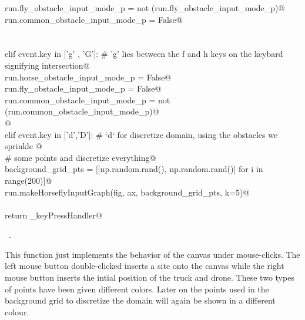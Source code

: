 \documentclass[11.5pt]{report}
\begin{document}
\begin{flushleft}
\begin{list}{}{}
\mbox{}\verb@                  run.fly_obstacle_input_mode_p     = not (run.fly_obstacle_input_mode_p)@\\
\mbox{}\verb@                  run.common_obstacle_input_mode_p  = False@\\
\mbox{}\verb@@\\
\mbox{}\verb@@\\
\mbox{}\verb@             elif event.key in ['g' , 'G']: # 'g' lies between the f and h keys on the keybard signifying intersection@\\
\mbox{}\verb@                  run.horse_obstacle_input_mode_p   = False@\\
\mbox{}\verb@                  run.fly_obstacle_input_mode_p     = False@\\
\mbox{}\verb@                  run.common_obstacle_input_mode_p  = not (run.common_obstacle_input_mode_p)@\\
\mbox{}\verb@    @\\
\mbox{}\verb@             elif event.key in ['d','D']: # `d` for discretize domain, using the obstacles we sprinkle @\\
\mbox{}\verb@                                          # some points and discretize everything@\\
\mbox{}\verb@                  background_grid_pts = [[np.random.rand(), np.random.rand()] for i in range(200)]@\\
\mbox{}\verb@                  run.makeHorseflyInputGraph(fig, ax, background_grid_pts, k=5)@\\
\mbox{}\verb@@\\
\mbox{}\verb@      return _keyPressHandler@\\
\mbox{}\verb@@{\NWsep}
\end{list}
\vspace{-1.5ex}
\footnotesize
\begin{list}{}{\setlength{\itemsep}{-\parsep}\setlength{\itemindent}{-\leftmargin}}
\item \NWtxtMacroRefIn\ .

\item{}
\end{list}
\vspace{4ex}
\end{flushleft}

This function just implements the behavior of the canvas under mouse-clicks. The left mouse button double-clicked inserts a site onto 
the canvas while the right mouse button inserts the intial position of the truck and drone. These two types of points have been given 
different colors. Later on the points used in the background grid to discretize the domain will again be shown in a different colour. 
\end{document}
